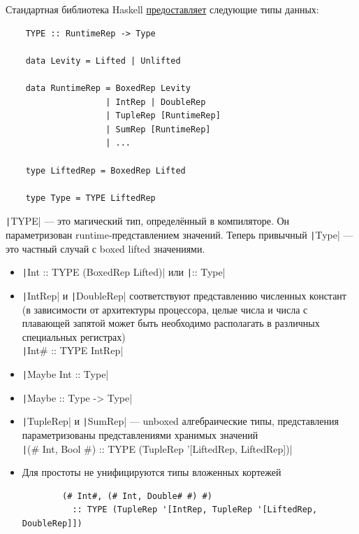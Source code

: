 Стандартная библиотека Haskell \href{https://downloads.haskell.org/ghc/latest/docs/users_guide/exts/representation_polymorphism.html}{предоставляет} следующие типы данных:
\begin{verbatim}
    TYPE :: RuntimeRep -> Type

    data Levity = Lifted | Unlifted

    data RuntimeRep = BoxedRep Levity
                    | IntRep | DoubleRep
                    | TupleRep [RuntimeRep]
                    | SumRep [RuntimeRep]
                    | ...

    type LiftedRep = BoxedRep Lifted

    type Type = TYPE LiftedRep
\end{verbatim}

\texttt|TYPE| --- это магический тип, определённый в компиляторе.
Он параметризован runtime-представлением значений.
Теперь привычный \texttt|Type| --- это частный случай с boxed lifted значениями.

\begin{itemize}
    \item \texttt|Int :: TYPE (BoxedRep Lifted)| или \texttt|:: Type|
    \item \texttt|IntRep| и \texttt|DoubleRep| соответствуют представлению численных констант (в зависимости от архитектуры процессора, целые числа и числа с плавающей запятой может быть необходимо располагать в различных специальных регистрах)\\ \texttt|Int# :: TYPE IntRep|
    \item \texttt|Maybe Int :: Type|
    \item \texttt|Maybe :: Type -> Type|
    \item \texttt|TupleRep| и \texttt|SumRep| --- unboxed алгебраические типы, представления параметризованы представлениями хранимых значений\\
    \texttt|(# Int, Bool #) :: TYPE (TupleRep '[LiftedRep, LiftedRep])|
    \item Для простоты не унифицируются типы вложенных кортежей
    \begin{verbatim}
        (# Int#, (# Int, Double# #) #)
          :: TYPE (TupleRep '[IntRep, TupleRep '[LiftedRep, DoubleRep]])
    \end{verbatim}
\end{itemize}

